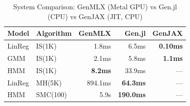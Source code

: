 \begin{table}[t]
\centering
\caption{System Comparison: GenMLX (Metal GPU) vs Gen.jl (CPU) vs GenJAX (JIT, CPU)}
\label{tab:system}
\small
\begin{tabular}{llrrr}
\toprule
Model & Algorithm & GenMLX & Gen.jl & GenJAX \\
\midrule
LinReg & IS(1K) & 1.8ms & 6.5ms & \textbf{0.10ms} \\
GMM & IS(1K) & 2.1ms & 5.8ms & \textbf{1.1ms} \\
HMM & IS(1K) & \textbf{8.2ms} & 33.9ms & --- \\
LinReg & MH(5K) & 894.1ms & \textbf{64.3ms} & --- \\
HMM & SMC(100) & 5.9s & \textbf{190.0ms} & --- \\
\bottomrule
\end{tabular}
\end{table}